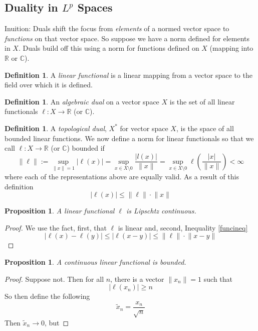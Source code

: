 \documentclass[12pt]{article}
\theoremstyle{plain}
\newtheorem{prop}[thm]{Proposition}
\theoremstyle{definition}
\newtheorem{defn}[thm]{Definition}
\theoremstyle{remark}
\begin{document}
\subsection{Duality in $L^p$ Spaces}

Inuition: Duals shift the focus from \emph{elements} of a normed vector space to \emph{functions} on that vector space. So suppose we have a norm defined for elements in $X$. Duals build off this using a norm for functions defined on $X$ (mapping into $\mathbb{R}$ or $\mathbb{C}$).

\begin{defn}
A \emph{linear functional} is a linear mapping from a vector space to the field over which it is defined.
\end{defn}

\begin{defn}
An \emph{algebraic dual} on a vector space $X$ is the set of all linear functionals $\ell: X\rightarrow\mathbb{R}$ (or $\mathbb{C}$). 
\end{defn}

\begin{defn}
A \emph{topological dual}, $X^*$ for vector space $X$, is the space of all bounded linear functions. We now define a norm for linear functionals so that we call $\ell: X\rightarrow \mathbb{R}$ (or $\mathbb{C}$) bounded if
\[
    \lVert \ell\rVert := \sup_{\lVert x\rVert=1} 
    |\ell(x)| 
    = \sup_{x\in X\setminus 0} 
    \frac{|l(x)|}{\lVert x\rVert} 
    = \sup_{x\in X\setminus 0} 
    \ell\left(
    \frac{|x|}{\lVert x\rVert} 
    \right)
    <\infty
\]
where each of the representations above are equally valid. As a result of this definition
\begin{equation}
    \label{funcineq}
    |\ell(x)| \leq \lVert \ell\rVert\cdot\lVert x\rVert
\end{equation}
\end{defn}

\begin{prop}
A linear functional $\ell$ is Lipschtz continuous.
\end{prop}
\begin{proof}
We use the fact, first, that $\ell$ is linear and, second, Inequality \ref{funcineq}
\[
    |\ell(x)-\ell(y)|\leq 
    |\ell(x-y)|\leq 
    \lVert \ell\rVert\cdot \lVert x-y\rVert
\] 
\end{proof}

\begin{prop}
A continuous linear functional is bounded.
\end{prop}
\begin{proof}
Suppose not. Then for all $n$, there is a vector $\lVert x_n\rVert=1$ such that 
\[
    |\ell(x_n)| \geq n 
\]
So then define the following
\[
    \tilde{x}_n = \frac{x_n}{\sqrt{n}}
\]
Then $\tilde{x}_n\rightarrow0$, but 
\end{proof}
\end{document}
